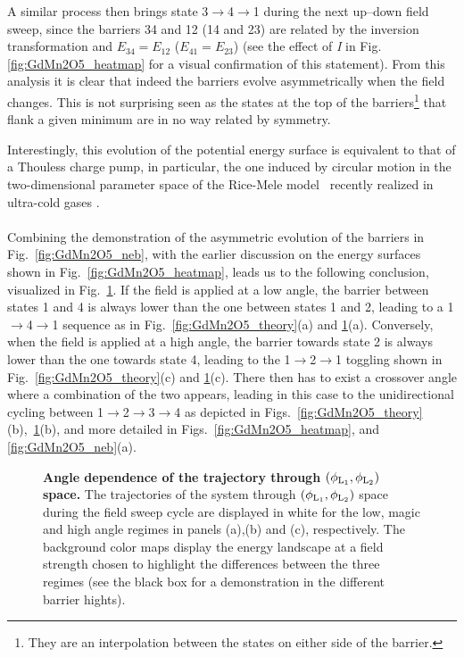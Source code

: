 A similar process then brings state 3$\rightarrow$4$\rightarrow$1 during the next up--down field sweep, since the barriers 34 and 12  (14 and 23) are related by the inversion transformation and  $E_{34} = E_{12}$ ($E_{41} = E_{23}$) (see the effect of {\it I} in Fig.\ref{fig:GdMn2O5_heatmap} for a visual confirmation of this statement).
From this analysis it is clear that indeed the barriers evolve asymmetrically when the field changes.
This is not surprising seen as the states at the top of the barriers\footnote{They are an interpolation between the states on either side of the barrier.} that flank a given minimum are in no way related by symmetry.

Interestingly, this evolution of the potential energy surface is equivalent to that of a Thouless charge pump, in particular, the one induced by circular motion in the two-dimensional parameter space of the Rice-Mele model~\cite{Rice82} recently realized in ultra-cold gases \cite{Lohse16,Nakajima16,Atala13}.
\\\\
Combining the demonstration of the asymmetric evolution of the barriers in Fig.~\ref{fig:GdMn2O5_neb}, with the earlier discussion on the energy surfaces shown in Fig.~\ref{fig:GdMn2O5_heatmap}, leads us to the following conclusion, visualized in Fig.~\ref{fig:GdMn2O5_trajectories}.
If the field is applied at a low angle, the barrier between states 1 and 4 is always lower than the one between states 1 and 2, leading to a 1$\rightarrow$4$\rightarrow$1 sequence as in Fig.~\ref{fig:GdMn2O5_theory}(a) and \ref{fig:GdMn2O5_trajectories}(a).
Conversely, when the field is applied at a high angle, the barrier towards state 2 is always lower than the one towards state 4, leading to the 1$\rightarrow$2$\rightarrow$1 toggling shown in Fig.~\ref{fig:GdMn2O5_theory}(c) and \ref{fig:GdMn2O5_trajectories}(c).
There then has to exist a crossover angle where a combination of the two appears, leading in this case to the unidirectional cycling between 1$\rightarrow$2$\rightarrow$3$\rightarrow$4 as depicted in Figs.~\ref{fig:GdMn2O5_theory}(b),~\ref{fig:GdMn2O5_trajectories}(b), and more detailed in Figs.~\ref{fig:GdMn2O5_heatmap}, and \ref{fig:GdMn2O5_neb}(a).
\begin{figure}
    \caption{\label{fig:GdMn2O5_trajectories}{\bf Angle dependence of the trajectory through $(\phi_{\rm L_1},\phi_{\rm L_2})$ space.}
    The trajectories of the system through $(\phi_{\rm L_1},\phi_{\rm L_2})$ space during the field sweep cycle are displayed in white for the low, magic and high angle regimes in panels (a),(b) and (c), respectively. The background color maps display the energy landscape at a field strength chosen to highlight the differences between the three regimes (see the black box for a demonstration in the different barrier hights). 
}
\end{figure}
